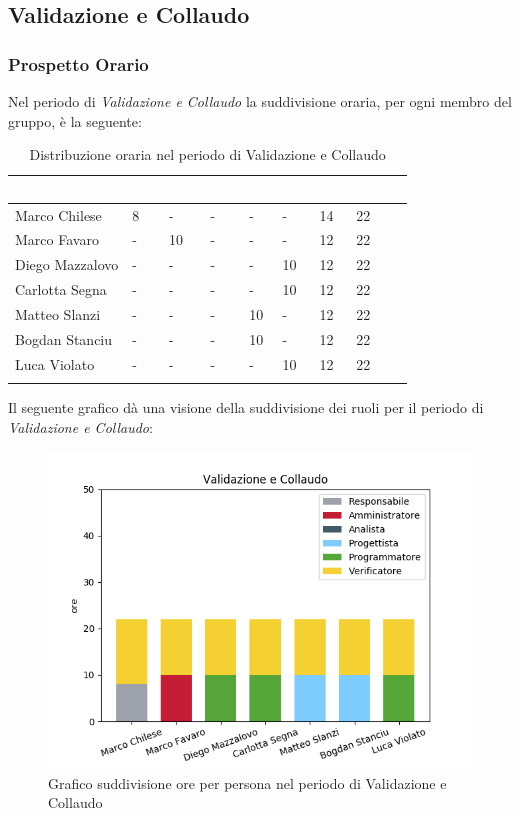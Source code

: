 \newpage
\subsection{Validazione e Collaudo}
\label{PVC}
\subsubsection{Prospetto Orario}
Nel periodo di \textit{Validazione e Collaudo} la suddivisione oraria, per ogni membro del gruppo, è la seguente:

\begin{longtable}{|C{.30\textwidth}|C{.06\textwidth}|C{.06\textwidth}|C{.06\textwidth} | C{.06\textwidth}| C{.06\textwidth} | C{.06\textwidth} | C{.10\textwidth} |}
	\hline
{}	\textbf{\textcolor{white}{Nome}} & \textbf{\textcolor{white}{RE}} & \textbf{\textcolor{white}{AM}} & \textbf{\textcolor{white}{AN}} & \textbf{\textcolor{white}{PJ}} & \textbf{\textcolor{white}{PR}} & \textbf{\textcolor{white}{VE}} & \textbf{\textcolor{white}{Totale}}\\
	\hline 
	Marco Chilese & 8 & - & - & - & - & 14 & 22 \\
	\hline
	Marco Favaro &  - & 10 & - & - & - & 12 & 22 \\
	\hline
	Diego Mazzalovo & - & - & - & - & 10 & 12 & 22 \\
	\hline
	Carlotta Segna & - & - & - & - & 10 & 12 & 22 \\
	\hline
	Matteo Slanzi & - & - & - & 10 & - & 12 & 22 \\
	\hline
	Bogdan Stanciu & - & - & - & 10 & - & 12 & 22 \\
	\hline
	Luca Violato & - & - & - & - & 10 & 12 & 22 \\   
	\hline
	
	
	\caption{Distribuzione oraria nel periodo di Validazione e Collaudo}
	\label{Distribuzione oraria vc}
\end{longtable}

Il seguente grafico dà una visione della suddivisione dei ruoli per il periodo di \textit{Validazione e Collaudo}:

\begin{figure}[H]
	\centering
	\includegraphics[width=0.8\linewidth]{./images/fig_vc.png}
	\caption{Grafico suddivisione ore per persona nel periodo di Validazione e Collaudo}
	\label{fig:grafico suddivione ruoli periodo vc}
\end{figure}


